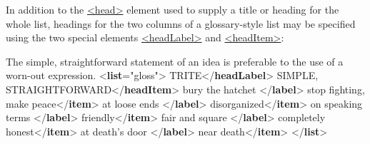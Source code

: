 In addition to the \hyperref[TEI.head]{<head>} element used to supply a title or heading for the whole list, headings for the two columns of a glossary-style list may be specified using the two special elements \hyperref[TEI.headLabel]{<headLabel>} and \hyperref[TEI.headItem]{<headItem>}: \par\bgroup{}\exampleFont \begin{shaded}\noindent\mbox{}The simple, straightforward statement of an idea is\mbox{}\newline 
 preferable to the use of a worn-out expression.\mbox{}\newline 
{<\textbf{list}\hspace*{1em}{type}="{gloss}">}\mbox{}\newline 
{}TRITE{</\textbf{headLabel}>}\mbox{}\newline 
{}SIMPLE, STRAIGHTFORWARD{</\textbf{headItem}>}\mbox{}\newline 
{}bury the hatchet {</\textbf{label}>}\mbox{}\newline 
{}stop fighting, make peace{</\textbf{item}>}\mbox{}\newline 
{}at loose ends {</\textbf{label}>}\mbox{}\newline 
{}disorganized{</\textbf{item}>}\mbox{}\newline 
{}on speaking terms {</\textbf{label}>}\mbox{}\newline 
{}friendly{</\textbf{item}>}\mbox{}\newline 
{}fair and square {</\textbf{label}>}\mbox{}\newline 
{}completely honest{</\textbf{item}>}\mbox{}\newline 
{}at death's door {</\textbf{label}>}\mbox{}\newline 
{}near death{</\textbf{item}>}\mbox{}\newline 
{</\textbf{list}>}\end{shaded}\egroup\par \par
